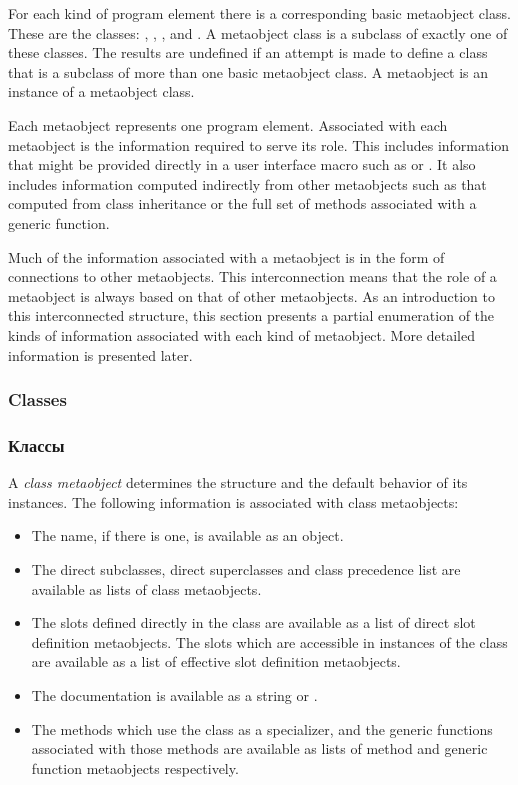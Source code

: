 For each kind of program element there is a corresponding basic metaobject
class. These are the classes: , ,
,  
and . A metaobject class is a subclass of exactly one of these
classes. The results are undefined if an attempt is made to define a class that
is a subclass of more than one basic metaobject class. A metaobject is an
instance of a metaobject class. 

Each metaobject represents one program element. Associated with each metaobject
is the information required to serve its role. This includes information that
might be provided directly in a user interface macro such as  or
. It also includes information computed indirectly from other
metaobjects such as that computed from class inheritance or the full set of
methods associated with a generic function. 

Much of the information associated with a metaobject is in the form of
connections to other metaobjects. This interconnection means that the role of a
metaobject is always based on that of other metaobjects. As an introduction to
this interconnected structure, this section presents a partial enumeration of
the kinds of information associated with each kind of metaobject. More detailed
information is presented later. 

\subsubsection{Classes}

\subsubsection{Классы}

A \emph{class metaobject} determines the structure and the default behavior of its
instances. The following information is associated with class metaobjects: 

  \begin{itemize}
  \item 
    The name, if there is one, is available as an object.

  \item 
    The direct subclasses, direct superclasses and class precedence list are
    available as lists of class metaobjects. 

  \item 
    The slots defined directly in the class are available as a list of direct
    slot definition metaobjects. The slots which are accessible in instances of
    the class are available as a list of effective slot definition metaobjects.

  \item 
    The documentation is available as a string or .

  \item 
    The methods which use the class as a specializer, and the generic functions
    associated with those methods are available as lists of method and generic
    function metaobjects respectively.
  \end{itemize}

